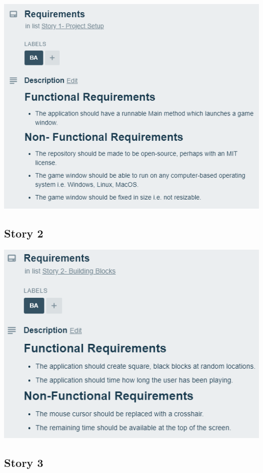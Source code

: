 \documentclass[12pt]{article}
\begin{document}
    \begin{center}
        \includegraphics[scale=0.9]{images/story1}
    \end{center}

\subsection{Story 2}

    \begin{center}
        \includegraphics[scale=0.8]{images/story2}
    \end{center}

\subsection{Story 3}
\end{document}
